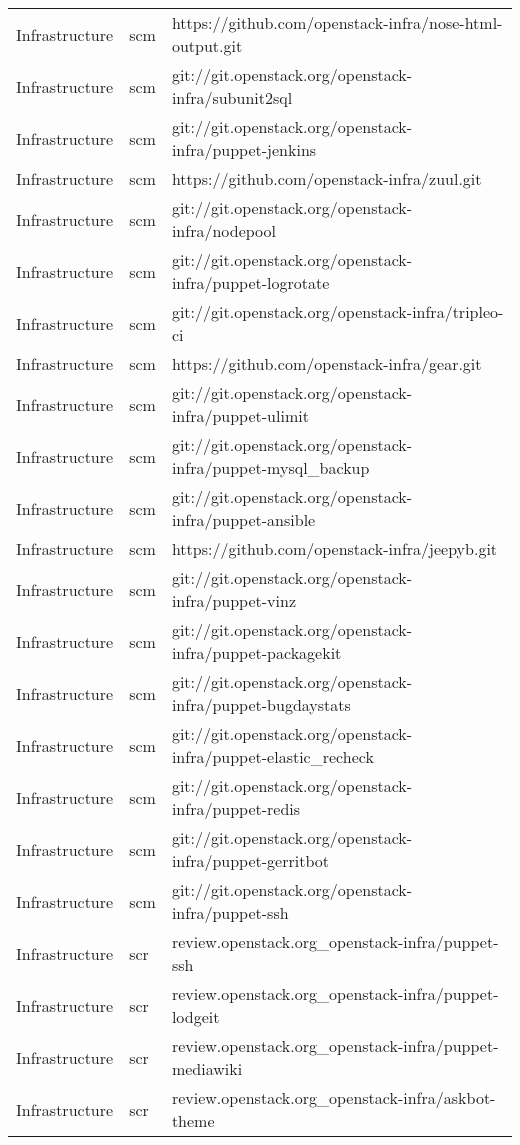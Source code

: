 \begin{center}
\begin{longtable}{|p{4cm}|p{1cm}|p{10cm}|}
Infrastructure&scm&https://github.com/openstack-infra/nose-html-output.git\\ 
Infrastructure&scm&git://git.openstack.org/openstack-infra/subunit2sql\\ 
Infrastructure&scm&git://git.openstack.org/openstack-infra/puppet-jenkins\\ 
Infrastructure&scm&https://github.com/openstack-infra/zuul.git\\ 
Infrastructure&scm&git://git.openstack.org/openstack-infra/nodepool\\ 
Infrastructure&scm&git://git.openstack.org/openstack-infra/puppet-logrotate\\ 
Infrastructure&scm&git://git.openstack.org/openstack-infra/tripleo-ci\\ 
Infrastructure&scm&https://github.com/openstack-infra/gear.git\\ 
Infrastructure&scm&git://git.openstack.org/openstack-infra/puppet-ulimit\\ 
Infrastructure&scm&git://git.openstack.org/openstack-infra/puppet-mysql\_backup\\ 
Infrastructure&scm&git://git.openstack.org/openstack-infra/puppet-ansible\\ 
Infrastructure&scm&https://github.com/openstack-infra/jeepyb.git\\ 
Infrastructure&scm&git://git.openstack.org/openstack-infra/puppet-vinz\\ 
Infrastructure&scm&git://git.openstack.org/openstack-infra/puppet-packagekit\\ 
Infrastructure&scm&git://git.openstack.org/openstack-infra/puppet-bugdaystats\\ 
Infrastructure&scm&git://git.openstack.org/openstack-infra/puppet-elastic\_recheck\\ 
Infrastructure&scm&git://git.openstack.org/openstack-infra/puppet-redis\\ 
Infrastructure&scm&git://git.openstack.org/openstack-infra/puppet-gerritbot\\ 
Infrastructure&scm&git://git.openstack.org/openstack-infra/puppet-ssh\\ 
Infrastructure&scr&review.openstack.org\_openstack-infra/puppet-ssh\\ 
Infrastructure&scr&review.openstack.org\_openstack-infra/puppet-lodgeit\\ 
Infrastructure&scr&review.openstack.org\_openstack-infra/puppet-mediawiki\\ 
Infrastructure&scr&review.openstack.org\_openstack-infra/askbot-theme\\ 

\end{longtable}
\end{center}
